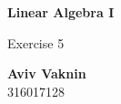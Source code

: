 \documentclass[a4paper, 12pt]{article}
\begin{document}
    \begin{center}
        \vspace*{4.4cm}
            
        \Huge
        \textbf{Linear Algebra I}
            
        \vspace{0.5cm}
        \LARGE
        Exercise 5

        \vfill
            
        \Large
        \textbf{Aviv Vaknin}\\316017128
                    
    \end{center}
\end{document}
